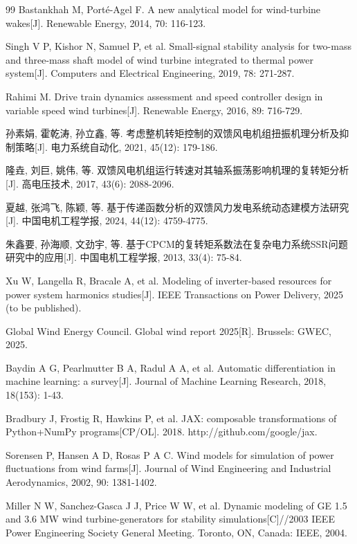 \documentclass[withoutpreface,bwprint]{cumcmthesis}
\begin{document}
\begin{thebibliography}{99}
Bastankhah M, Porté-Agel F. A new analytical model for wind-turbine wakes[J]. Renewable Energy, 2014, 70: 116-123.

Singh V P, Kishor N, Samuel P, et al. Small-signal stability analysis for two-mass and three-mass shaft model of wind turbine integrated to thermal power system[J]. Computers and Electrical Engineering, 2019, 78: 271-287.

Rahimi M. Drive train dynamics assessment and speed controller design in variable speed wind turbines[J]. Renewable Energy, 2016, 89: 716-729.

孙素娟, 霍乾涛, 孙立鑫, 等. 考虑整机转矩控制的双馈风电机组扭振机理分析及抑制策略[J]. 电力系统自动化, 2021, 45(12): 179-186.

隆垚, 刘巨, 姚伟, 等. 双馈风电机组运行转速对其轴系振荡影响机理的复转矩分析[J]. 高电压技术, 2017, 43(6): 2088-2096.

夏越, 张鸿飞, 陈颖, 等. 基于传递函数分析的双馈风力发电系统动态建模方法研究[J]. 中国电机工程学报, 2024, 44(12): 4759-4775.

朱鑫要, 孙海顺, 文劲宇, 等. 基于CPCM的复转矩系数法在复杂电力系统SSR问题研究中的应用[J]. 中国电机工程学报, 2013, 33(4): 75-84.

Xu W, Langella R, Bracale A, et al. Modeling of inverter-based resources for power system harmonics studies[J]. IEEE Transactions on Power Delivery, 2025 (to be published).

Global Wind Energy Council. Global wind report 2025[R]. Brussels: GWEC, 2025.

Baydin A G, Pearlmutter B A, Radul A A, et al. Automatic differentiation in machine learning: a survey[J]. Journal of Machine Learning Research, 2018, 18(153): 1-43.

Bradbury J, Frostig R, Hawkins P, et al. JAX: composable transformations of Python+NumPy programs[CP/OL]. 2018. http://github.com/google/jax.

Sorensen P, Hansen A D, Rosas P A C. Wind models for simulation of power fluctuations from wind farms[J]. Journal of Wind Engineering and Industrial Aerodynamics, 2002, 90: 1381-1402.

Miller N W, Sanchez-Gasca J J, Price W W, et al. Dynamic modeling of GE 1.5 and 3.6 MW wind turbine-generators for stability simulations[C]//2003 IEEE Power Engineering Society General Meeting. Toronto, ON, Canada: IEEE, 2004.


\end{thebibliography}
\end{document}
